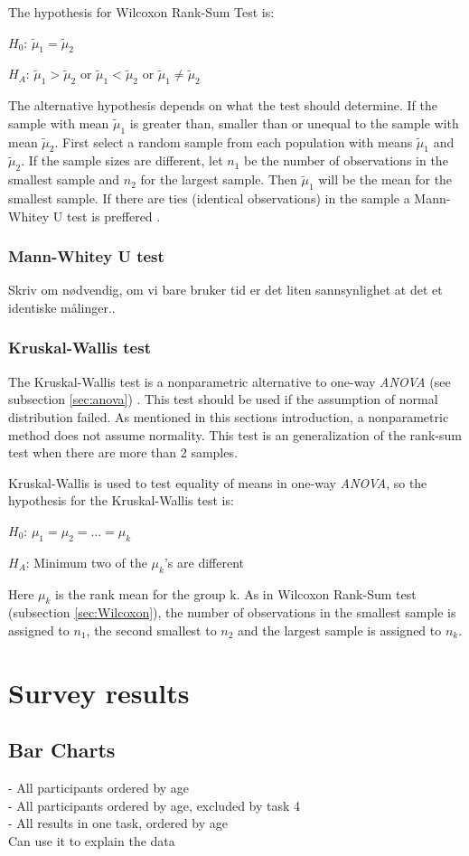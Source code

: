 The hypothesis for Wilcoxon Rank-Sum Test is:\newline

\centerline{$H_{0}$:  $\tilde{\mu}_{1} =  \tilde{\mu}_{2} $} 
\centerline{$H_{A}$: $\tilde{\mu}_{1} >  \tilde{\mu}_{2} $ or $\tilde{\mu}_{1} <  \tilde{\mu}_{2} $ or $\tilde{\mu}_{1} \neq  \tilde{\mu}_{2} $}

The alternative hypothesis depends on what the test should determine. If the sample with mean $\tilde{\mu}_1$ is greater than, smaller than or unequal to the sample with mean $\tilde{\mu}_2$.  First select a random sample from each population with means $\tilde{\mu}_{1} $ and $ \tilde{\mu}_{2} $. If the sample sizes are different, let $n_{1}$ be the number of observations in the smallest sample and $n_{2}$ for the largest sample. Then $\tilde{\mu}_1$ will be the mean for the smallest sample. If there are ties (identical observations) in the sample a Mann-Whitey U test is preffered \citep{TheScipycommunity2017}. 

\subsubsection{Mann-Whitey U test}
Skriv om nødvendig, om vi bare bruker tid er det liten sannsynlighet at det et identiske målinger.. 

\subsubsection[Kruskal]{Kruskal-Wallis test}
The Kruskal-Wallis test is a nonparametric alternative to one-way \textit{ANOVA} (see subsection \ref{sec:anova})  \citep{Walpole2012}. This test should be used if the assumption of normal distribution failed. As mentioned in this sections introduction, a nonparametric method does not assume normality. This test is an generalization of the rank-sum test when there are more than 2 samples.

Kruskal-Wallis is used to test equality of means in one-way \textit{ANOVA}, so the hypothesis for the Kruskal-Wallis test is:\newline

\centerline{$H_{0}$:  $\mu_{1} =  \mu_{2} = ... = \mu_{k} $} 
\centerline{$H_{A}$: Minimum two of the $\mu_{k}$'s are different}

Here $\mu_{k}$ is the rank mean for the group k. As in Wilcoxon Rank-Sum test (subsection \ref{sec:Wilcoxon}), the number of observations in the smallest sample is assigned to $n_1$, the second smallest to $n_2$ and the largest sample is assigned to $n_k$. 

\section{Survey results}

\subsection{Bar Charts}

- All participants ordered by age \\
- All participants ordered by age, excluded by task 4 \\
- All results in one task, ordered by age \\ 

Can use it to explain the data